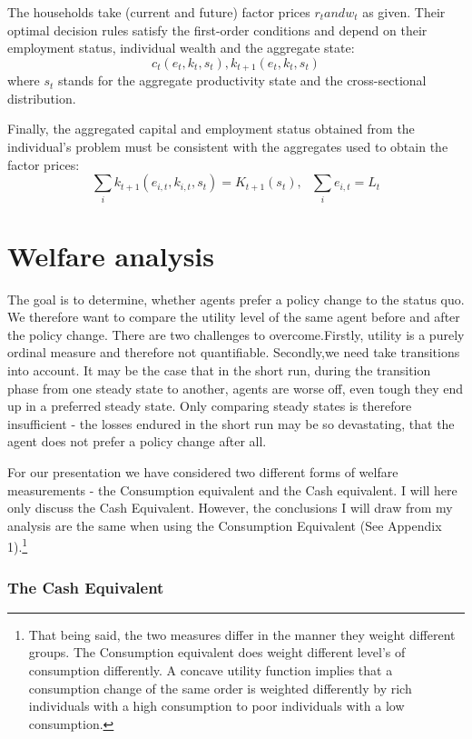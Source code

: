 \documentclass[a4paper,12pt]{article}
\begin{document}
The households take (current and future) factor prices $r_{t} and w_{t}$ as given. Their optimal decision rules satisfy the first-order conditions and depend on their employment status, individual wealth and the aggregate state: 
\[ c_{t}(e_{t},k_{t},s_{t}), k_{t+1}(e_{t},k_{t},s_{t})
\]
where $s_{t}$ stands for the aggregate productivity state and the cross-sectional distribution. 

Finally, the aggregated capital and employment status obtained from the individual's problem must be consistent with the aggregates used to obtain the factor prices: 
\[ \sum_{i}k_{t+1}(e_{i,t},k_{i,t},s_{t})=K_{t+1}(s_{t}), \ \ \ \sum_{i}e_{i,t}=L_{t} 
\]

\section{Welfare analysis}
The goal is to determine, whether agents prefer a policy change to the status quo. We therefore want to compare the utility level of the same agent before and after the policy change. There are two challenges to overcome.Firstly, utility is a purely ordinal measure and therefore not quantifiable. Secondly,we need take transitions into account. It may be the case that in the short run, during the transition phase from one steady state to another, agents are worse off, even tough they end up in a preferred steady state. Only comparing steady states is therefore insufficient - the losses endured in the short run may be so devastating, that the agent does not prefer a policy change after all. 

For our presentation we have considered two different forms of welfare measurements - the Consumption equivalent and the Cash equivalent. I will here only discuss the Cash Equivalent. However, the conclusions I will draw from my analysis are the same when using the Consumption Equivalent (See Appendix 1).\footnote{That being said, the two measures differ in the manner they weight different groups. The Consumption equivalent does weight different level's of consumption differently. A concave utility function implies that a consumption change of the same order is weighted differently by rich individuals with a high consumption to poor individuals with a low consumption.} 

\subsubsection*{The Cash Equivalent}
\end{document}
